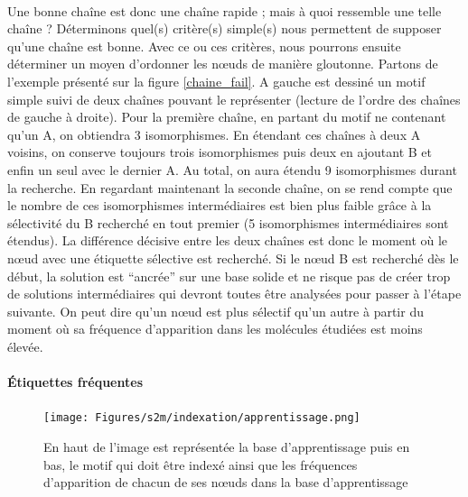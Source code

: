 \documentclass[12pt,french,twoside]{report}
\begin{document}
\paragraph{}Une bonne chaîne est donc une chaîne rapide ; mais à quoi ressemble une telle chaîne ? Déterminons quel(s) critère(s)
simple(s) nous permettent de supposer qu'une chaîne est bonne. Avec ce ou ces critères, nous pourrons ensuite déterminer un
moyen d'ordonner les n\oe{}uds de manière gloutonne. Partons de l'exemple présenté sur la figure \ref{chaine_fail}. A gauche est
dessiné un motif simple suivi de deux chaînes pouvant le représenter (lecture de l'ordre des chaînes de gauche à droite). Pour
la première chaîne, en partant du motif ne contenant qu'un A, on obtiendra 3 isomorphismes. En étendant ces chaînes à deux A
voisins, on conserve toujours trois isomorphismes puis deux en ajoutant B et enfin un seul avec le dernier A. Au total, on aura
étendu 9 isomorphismes durant la recherche. En regardant maintenant la seconde chaîne, on se rend compte que le nombre de ces
isomorphismes intermédiaires est bien plus faible grâce à la sélectivité du B recherché en tout premier (5 isomorphismes
intermédiaires sont étendus). La différence décisive entre les deux chaînes est donc le moment où le n\oe{}ud avec une étiquette sélective
est recherché. Si le n\oe{}ud B est recherché dès le début, la solution est ``ancrée'' sur une base solide et ne risque pas de 
créer trop de solutions intermédiaires qui devront toutes être analysées pour passer à l'étape suivante. On peut dire qu'un n\oe{}ud
est plus sélectif qu'un autre à partir du moment où sa fréquence d'apparition dans les molécules étudiées est moins élevée.

\paragraph{Étiquettes fréquentes}

\begin{figure}[!ht]
  \begin{center}
    \texttt{[image: Figures/s2m/indexation/apprentissage.png]}
    \caption{\label{apprentissage}En haut de l'image est représentée la base d'apprentissage puis en bas, le motif qui doit être indexé ainsi que les fréquences d'apparition de chacun de ses n\oe{}uds dans la base d'apprentissage}
  \end{center}
\end{figure}
\end{document}
